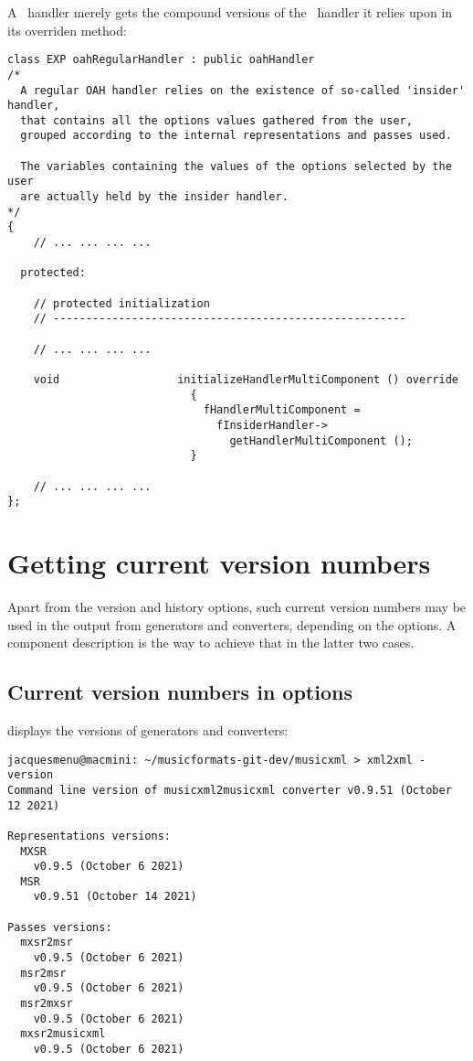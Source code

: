 A \regular\ handler merely gets the compound versions of the \insider\ handler it relies upon in its overriden  method:
\begin{lstlisting}[language=CPlusPlus]
class EXP oahRegularHandler : public oahHandler
/*
  A regular OAH handler relies on the existence of so-called 'insider' handler,
  that contains all the options values gathered from the user,
  grouped according to the internal representations and passes used.

  The variables containing the values of the options selected by the user
  are actually held by the insider handler.
*/
{
	// ... ... ... ...

  protected:

    // protected initialization
    // ------------------------------------------------------

	// ... ... ... ...

    void                  initializeHandlerMultiComponent () override
                            {
                              fHandlerMultiComponent =
                                fInsiderHandler->
                                  getHandlerMultiComponent ();
                            }

	// ... ... ... ...
};
\end{lstlisting}


\section{Getting current version numbers}\label{Getting current version numbers}

Apart from the version and history options, such current version numbers may be used in the output from generators and converters, depending on the options. A component description is the way to achieve that in the latter two cases.


\subsection{Current version numbers in options}\label{Current version numbers in options}

 displays the versions of generators and converters:
\begin{lstlisting}[language=Terminal]
jacquesmenu@macmini: ~/musicformats-git-dev/musicxml > xml2xml -version
Command line version of musicxml2musicxml converter v0.9.51 (October 12 2021)

Representations versions:
  MXSR
    v0.9.5 (October 6 2021)
  MSR
    v0.9.51 (October 14 2021)

Passes versions:
  mxsr2msr
    v0.9.5 (October 6 2021)
  msr2msr
    v0.9.5 (October 6 2021)
  msr2mxsr
    v0.9.5 (October 6 2021)
  mxsr2musicxml
    v0.9.5 (October 6 2021)
\end{lstlisting}

